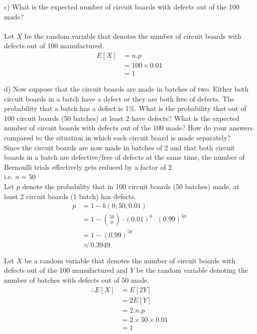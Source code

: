\documentclass[14pt]{extreport}
\begin{document}
\begin{enumerate}[label=(\alph*)]
c) What is the expected number of circuit boards with defects out of the 100 made?\\\\
Let $X$ be the random variable that denotes the number of circuit boards with defects out of 100 manufactured.
\begin{align*}
    E[X]    &=  n.p\\
            &=  100 \times 0.01\\
            &=  1
\end{align*}

d) Now suppose that the circuit boards are made in batches of two. Either both circuit boards in a batch have a defect or they are both free of defects. The probability that a batch has a defect is 1\%. What is the probability that out of 100 circuit boards (50 batches) at least 2 have defects? What is the expected number of circuit boards with defects out of the 100 made? How do your answers compared to the situation in which each circuit board is made separately?\\

Since the circuit boards are now made in batches of 2 and that both circuit boards in a batch are defective/free of defects at the same time, the number of Bernoulli trials effectively gets reduced by a factor of 2.\\
i.e. $n = 50$\\

Let $p$ denote the probability that in 100 circuit boards (50 batches) made, at least 2 circuit boards (1 batch) has defects.
\begin{align*}
        p  &=  1 - b\left ( 0; 50, 0.01 \right )\\
                &= 1 - \binom{50}{0}\cdot (0.01)^{0}\cdot (0.99)^{50}\\
                &= 1-(0.99)^{50}\\
                &\approx 0.3949
\end{align*}

Let $X$ be a random variable that denotes the number of circuit boards with defects out of the 100 manufactured and $Y$ be the random variable denoting the number of batches with defects out of 50 made.
\begin{align*}
    \therefore E[X]    &= E[2Y]\\
            &= 2E[Y]\\
            &=  2.n.p\\
            &=  2 \times 50 \times 0.01\\
            &=  1
\end{align*}


\end{enumerate}
\end{document}
